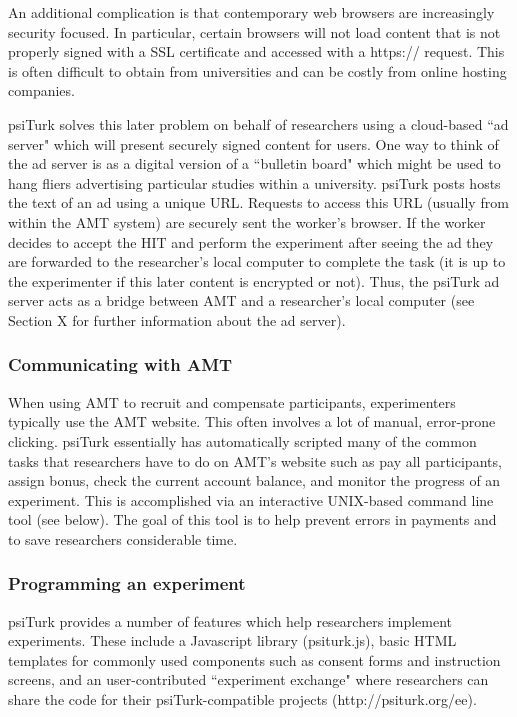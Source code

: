 \documentclass[twocolumn]{svjour3}          %
\begin{document}
An additional complication is that contemporary web browsers are increasingly security
focused.  In particular, certain browsers will not load content that is not properly 
signed with a SSL certificate and accessed with a \textsf{https://} request.  This
is often difficult to obtain from universities and can be costly from online
hosting companies.  

\textsf{psiTurk} solves this later problem on behalf of researchers
using a cloud-based ``ad server" which will present securely signed
content for users.  One way to think of the ad server is as a digital
version of a ``bulletin board" which might be used to hang fliers
advertising particular studies within a university.  \textsf{psiTurk}
posts hosts the text of an ad using a unique URL.  Requests to access
this URL (usually from within the AMT system) are securely sent
the worker's browser.  If the worker decides to accept the HIT and
perform the experiment after seeing the ad they are forwarded to
the researcher's local computer to complete the task (it is up to the
experimenter if this later content is encrypted or not). Thus, 
the \textsf{psiTurk} ad server acts as a bridge between AMT and 
a researcher's local computer (see Section X for further information 
about the ad server). 


\subsubsection{Communicating with AMT}

When using AMT to recruit and compensate participants,
experimenters typically use the AMT website.  This often
involves a lot of manual, error-prone clicking.   \textsf{psiTurk}
essentially has automatically scripted many of the common
tasks that researchers have to do on AMT's website such
as pay all participants, assign bonus, check the current
account balance, and monitor the progress of an experiment.
This is accomplished via an interactive UNIX-based command
line tool (see below).
The goal of this tool is to help prevent errors in payments and
to save researchers considerable time.

\subsubsection{Programming an experiment}
\textsf{psiTurk} provides a number of features which help researchers implement 
experiments.  These include a Javascript library (psiturk.js), basic HTML templates 
for commonly used components such as consent forms and instruction screens, 
and an user-contributed ``experiment exchange" where researchers can share the code for their \textsf{psiTurk}-compatible
projects (\textsf{http://psiturk.org/ee}). 
\end{document}
